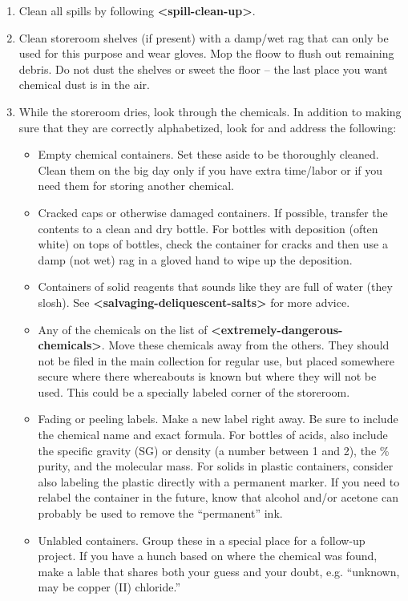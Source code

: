 \documentclass{report}
\begin{document}
\begin{enumerate}
\item{Clean all spills by following \textbf{\textless spill-clean-up\textgreater }.}
\item{Clean storeroom shelves (if present) with a damp/wet rag that can only be used for this purpose and wear gloves. Mop the floow to flush out remaining debris. Do not dust the shelves or sweet the floor -- the last place you want chemical dust is in the air.}
\item{While the storeroom dries, look through the chemicals. In addition to making sure that they are correctly alphabetized, look for and address the following:
\begin{itemize}
\item{Empty chemical containers. Set these aside to be thoroughly cleaned. Clean them on the big day only if you have extra time/labor or if you need them for storing another chemical.}
\item{Cracked caps or otherwise damaged containers. If possible, transfer the contents to a clean and dry bottle. For bottles with deposition (often white) on tops of bottles, check the container for cracks and then use a damp (not wet) rag in a gloved hand to wipe up the deposition.}
\item{Containers of solid reagents that sounds like they are full of water (they slosh). See \textbf{\textless salvaging-deliquescent-salts\textgreater } for more advice.}
\item{Any of the chemicals on the list of \textbf{\textless extremely-dangerous-chemicals\textgreater }. Move these chemicals away from the others. They should not be filed in the main collection for regular use, but placed somewhere secure where there whereabouts is known but where they will not be used. This could be a specially labeled corner of the storeroom.}
\item{Fading or peeling labels. Make a new label right away. Be sure to include the chemical name and exact formula. For bottles of acids, also include the specific gravity (SG) or density (a number between 1 and 2), the \% purity, and the molecular mass. For solids in plastic containers, consider also labeling the plastic directly with a permanent marker. If you need to relabel the container in the future, know that alcohol and/or acetone can probably be used to remove the ``permanent'' ink.}
\item{Unlabled containers. Group these in a special place for a follow-up project. If you have a hunch based on where the chemical was found, make a lable that shares both your guess and your doubt, e.g. ``unknown, may be copper (II) chloride.''}

\end{itemize}}
\end{enumerate}
\end{document}
